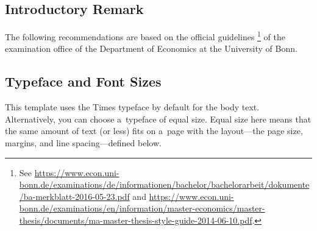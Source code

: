 \documentclass[12pt, a4paper, oneside]{article}
\theoremstyle{Plain}
\theoremstyle{Definition}
\theoremstyle{Remark}
\begin{document}
\subsection{Introductory Remark}
The following recommendations are based on the official guidelines%
\footnote{See \url{https://www.econ.uni-bonn.de/examinations/de/informationen/bachelor/bachelorarbeit/dokumente/ba-merkblatt-2016-05-23.pdf} and \url{https://www.econ.uni-bonn.de/examinations/en/information/master-economics/master-thesis/documents/ma-master-thesis-style-guide-2014-06-10.pdf}.}
of the examination office of the Department of Economics at the University of Bonn.

\subsection{Typeface and Font Sizes}
This template uses the Times typeface by default for the body text. Alternatively, you can choose a~typeface of equal size. Equal size here means that the same amount of text (or less) fits on a~page with the layout---the page size, margins, and line spacing---defined below.
\end{document}
